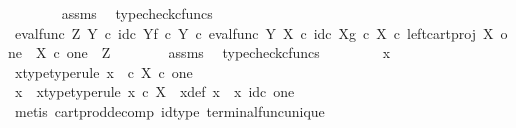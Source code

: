 \begin{isabellebody}
\ \ \ \ \ \ \isamarkupfalse%
\ assms\ \isamarkupfalse%
\ typecheck{\isacharunderscore}{\kern0pt}cfuncs\isanewline
\ \ \ \ \isamarkupfalse%
\ {\isachardoublequoteopen}{\isacharparenleft}{\kern0pt}{\isacharparenleft}{\kern0pt}eval{\isacharunderscore}{\kern0pt}func\ Z\ Y\ {\isasymcirc}\isactrlsub c\ {\isasymlangle}id\isactrlsub c\ Y{\isacharcomma}{\kern0pt}f\ {\isasymcirc}\isactrlsub c\ {\isasymbeta}\isactrlbsub Y\isactrlesub {\isasymrangle}{\isacharparenright}{\kern0pt}\ {\isasymcirc}\isactrlsub c\ eval{\isacharunderscore}{\kern0pt}func\ Y\ X\ {\isasymcirc}\isactrlsub c\ {\isasymlangle}id\isactrlsub c\ X{\isacharcomma}{\kern0pt}g\ {\isasymcirc}\isactrlsub c\ {\isasymbeta}\isactrlbsub X\isactrlesub {\isasymrangle}{\isacharparenright}{\kern0pt}\ {\isasymcirc}\isactrlsub c\ left{\isacharunderscore}{\kern0pt}cart{\isacharunderscore}{\kern0pt}proj\ X\ one\ {\isacharcolon}{\kern0pt}\ X\ {\isasymtimes}\isactrlsub c\ one\ {\isasymrightarrow}\ Z{\isachardoublequoteclose}\isanewline
\ \ \ \ \ \ \isamarkupfalse%
\ assms\ \isamarkupfalse%
\ typecheck{\isacharunderscore}{\kern0pt}cfuncs\isanewline
\ \ \isamarkupfalse%
\isanewline
\ \ \ \ \isamarkupfalse%
\ x{}\ \isanewline
\ \ \ \ \isamarkupfalse%
\ x{}{\isacharunderscore}{\kern0pt}type{\isacharbrackleft}{\kern0pt}type{\isacharunderscore}{\kern0pt}rule{\isacharbrackright}{\kern0pt}{\isacharcolon}{\kern0pt}\ {\isachardoublequoteopen}x{}\ \ {\isasymin}\isactrlsub c\ {\isacharparenleft}{\kern0pt}X\ {\isasymtimes}\isactrlsub c\ one{\isacharparenright}{\kern0pt}{\isachardoublequoteclose}\isanewline
\ \ \ \ \isamarkupfalse%
\ \isamarkupfalse%
\ x\ \ x{\isacharunderscore}{\kern0pt}type{\isacharbrackleft}{\kern0pt}type{\isacharunderscore}{\kern0pt}rule{\isacharbrackright}{\kern0pt}{\isacharcolon}{\kern0pt}\ {\isachardoublequoteopen}x\ {\isasymin}\isactrlsub c\ X{\isachardoublequoteclose}\ \ x{\isacharunderscore}{\kern0pt}def{\isacharcolon}{\kern0pt}\ {\isachardoublequoteopen}x{}\ {\isacharequal}{\kern0pt}\ {\isasymlangle}x{\isacharcomma}{\kern0pt}\ id\isactrlsub c\ one{\isasymrangle}{\isachardoublequoteclose}\isanewline
\ \ \ \ \ \ \isamarkupfalse%
\ {\isacharparenleft}{\kern0pt}metis\ cart{\isacharunderscore}{\kern0pt}prod{\isacharunderscore}{\kern0pt}decomp\ id{\isacharunderscore}{\kern0pt}type\ terminal{\isacharunderscore}{\kern0pt}func{\isacharunderscore}{\kern0pt}unique{\isacharparenright}{\kern0pt}\isanewline

\end{isabellebody}
